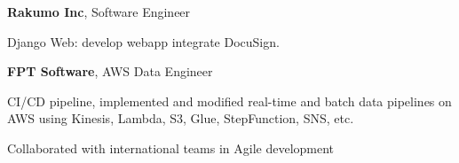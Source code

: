 


\begin{twocolentry}{
	}
	\textbf{Rakumo Inc}, Software Engineer
	\begin{highlights}
		\item Django Web: develop webapp integrate DocuSign.
	\end{highlights}
\end{twocolentry}

\begin{twocolentry}{
	}
	\textbf{FPT Software}, AWS Data Engineer
	
	\begin{highlights}
		\item CI/CD pipeline, implemented and modified real-time and batch data pipelines on AWS using Kinesis, Lambda, S3, Glue, StepFunction, SNS, etc.
		\item Collaborated with international teams in Agile development
		
		
	\end{highlights}
	
	
\end{twocolentry}

